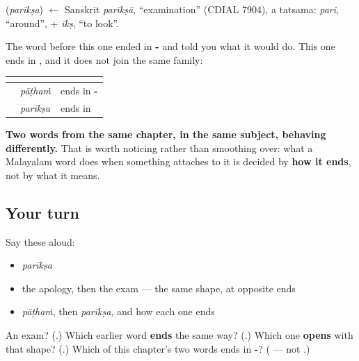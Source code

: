 \begin{cousinweb}
\textbf{} (\emph{parīkṣa}) $\leftarrow$ Sanskrit \emph{parīkṣā}, \textquotedblleft{}examination\textquotedblright{} (CDIAL 7904), a tatsama: \emph{pari}, \textquotedblleft{}around\textquotedblright{}, + \emph{īkṣ}, \textquotedblleft{}to look\textquotedblright{}.
\end{cousinweb}

\begin{grammarlens}[title={Grammar Lens: this one does not end in -\ml{ം}}]
The word before this one ended in \textbf{-} and told you what it would do. This one ends in \textbf{}, and it does not join the same family:

\noindent
\begin{tabularx}{\linewidth}{@{}>{\raggedright\arraybackslash}X>{\raggedright\arraybackslash}X>{\raggedright\arraybackslash}X@{}}
\toprule
\textbf{} & \textbf{} & \textbf{} \\
\midrule
\textbf{\ml{പാഠം}} & \emph{pāṭhaṁ} & ends in \textbf{-\ml{ം}} \\
\textbf{\ml{പരീക്ഷ}} & \emph{parīkṣa} & ends in \textbf{\ml{അ}} \\
\bottomrule
\end{tabularx}

\textbf{Two words from the same chapter, in the same subject, behaving differently.} That is worth noticing rather than smoothing over: what a Malayalam word does when something attaches to it is decided by \textbf{how it ends}, not by what it means.
\end{grammarlens}

\subsection*{Your turn}
Say these aloud:

\begin{itemize}
\raggedright
  \item \emph{parīkṣa}
  \item the apology, then the exam — the same shape, at opposite ends
  \item \emph{pāṭhaṁ}, then \emph{parīkṣa}, and how each one ends
\end{itemize}

\begin{tcolorbox}[breakable,colback=teal!4,colframe=teal!35!black,title={Before you move on}]
An exam? (\textbf{}.) Which earlier word \textbf{ends} the same way? (\textbf{}.) Which one \textbf{opens} with that shape? (\textbf{}.) Which of this chapter's two words ends in \textbf{-}? (\textbf{} — not \textbf{}.)
\end{tcolorbox}
